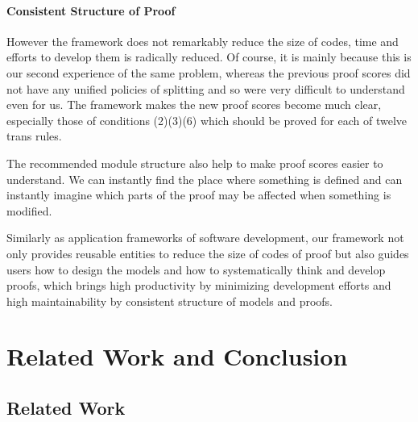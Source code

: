 \documentclass[12pt]{report}
\begin{document}
\subsubsection{Consistent Structure of Proof}
However the framework does not remarkably reduce the size of codes,
time and efforts to develop them is radically reduced. Of course, it
is mainly because this is our second experience of the same problem,
whereas the previous proof scores did not have any unified policies of
splitting and so were very difficult to understand even for us. The
framework makes the new proof scores become much clear, especially
those of conditions (2)(3)(6) which should be proved for each of
twelve trans rules.

The recommended module structure also help to make proof scores easier
to understand.  We can instantly find the place where something is
defined and can instantly imagine which parts of the proof may be
affected when something is modified.

Similarly as application frameworks of software development, our
framework not only provides reusable entities to reduce the size of
codes of proof but also guides users how to design the models and how
to systematically think and develop proofs, which brings high
productivity by minimizing development efforts and high
maintainability by consistent structure of models and proofs.

\chapter{Related Work and Conclusion}
\label{chap:conclusion}
\section{Related Work}
\end{document}
